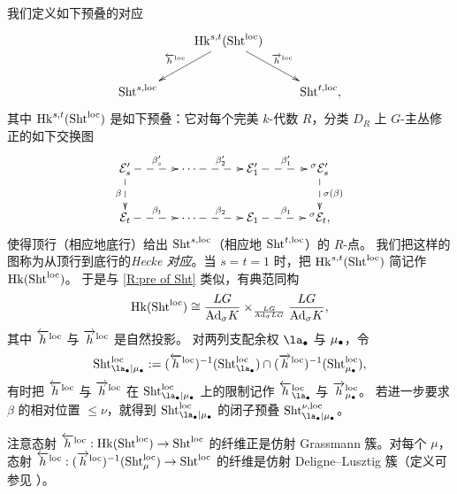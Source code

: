 我们定义如下预叠的对应
\begin{equation}
\label{E;Hk Shtuka}
\xymatrix{&\Hk^{s,t}(\Sht^\loc)\ar_{\overleftarrow{h}^\loc}[dl]\ar^{\overrightarrow{h}^\loc}[dr]&\\
\Sht^{s,\loc}&&\Sht^{t,\loc},
}
\end{equation}
其中 ${\operatorname{Hk}}^{s,t}(\operatorname{Sht}^{\mathrm{loc}})$ 是如下预叠：它对每个完美 $k$-代数 $R$，分类 $D_R$ 上 $G$-主丛修正的如下交换图
\begin{equation*}\label{qi for diff type}
\xymatrix@C=35pt{
\mE'_s \ar@{-->}[r]^{\beta'_s} \ar@{-->}[d]_\beta & \cdots  \ar@{-->}[r]^{\beta'_2} & \calE'_1 \ar@{-->}[r]^{\beta'_1} & {}^\sigma\mE'_s \ar@{-->}[d]^{\sigma(\beta)}\\
\mE_t \ar@{-->}[r]^{\beta_t} & \cdots  \ar@{-->}[r]^{\beta_2} & \calE_1 \ar@{-->}[r]^{\beta_1} & {}^\sigma\mE_t,
}
\end{equation*}
使得顶行（相应地底行）给出 $\operatorname{Sht}^{s,\mathrm{loc}}$（相应地 $\operatorname{Sht}^{t,\mathrm{loc}}$）的 $R$-点。
我们把这样的图称为从顶行到底行的\emph{Hecke 对应}。当 $s=t=1$ 时，把 ${\operatorname{Hk}}^{s,t}(\operatorname{Sht}^{\mathrm{loc}})$ 简记作 ${\operatorname{Hk}}(\operatorname{Sht}^{\mathrm{loc}})$。
于是与 \eqref{R:pre of Sht} 类似，有典范同构
$${\operatorname{Hk}}(\operatorname{Sht}^{\mathrm{loc}})\cong \frac{LG}{{\operatorname{Ad}}_\sigma K}\times_{\frac{LG}{{\operatorname{Ad}}_\sigma LG}} \frac{LG}{{\operatorname{Ad}}_\sigma K},$$
其中 $\overleftarrow{h}^{\mathrm{loc}}$ 与 $\overrightarrow{h}^{\mathrm{loc}}$ 是自然投影。
对两列支配余权 $\la_\bullet$ 与 ${\mu_\bullet}$，令
\[\Sht^{\loc}_{\la_\bullet\mid\mmu}:=(\overleftarrow{h}^\loc)^{-1}(\Sht^\loc_{\la_\bullet})\cap (\overrightarrow{h}^\loc)^{-1}(\Sht^\loc_{\mmu}),\]
有时把 $\overleftarrow{h}^{\mathrm{loc}}$ 与 $\overrightarrow{h}^{\mathrm{loc}}$ 在 $\Sht^{\loc}_{\la_\bullet\mid\mmu}$ 上的限制记作 $\overleftarrow{h}^\loc_{\la_\bullet}$ 与 $\overrightarrow{h}^{\mathrm{loc}}_{\mu_\bullet}$。
若进一步要求 $\beta$ 的相对位置 $\leq \nu$，就得到 $\Sht_{\la_\bullet|\mmu}^{\loc}$ 的闭子预叠 $\Sht_{\la_\bullet|\mmu}^{\nu,\loc}$。

\begin{rmk}
\label{R:fiber of hloc}
注意态射 $\overleftarrow{h}^{\mathrm{loc}}: {\operatorname{Hk}}(\operatorname{Sht}^{\mathrm{loc}})\to\operatorname{Sht}^{\mathrm{loc}}$ 的纤维正是仿射 Grassmann 簇。对每个 $\mu$，态射
$\overleftarrow{h}^{\mathrm{loc}}: (\overrightarrow{h}^{\mathrm{loc}})^{-1}(\operatorname{Sht}^{\mathrm{loc}}_\mu)\to \operatorname{Sht}^{\mathrm{loc}}$ 的纤维是仿射 Deligne–Lusztig 簇（定义可参见 \cite[\S 3.1]{Zh1}）。
\end{rmk}
